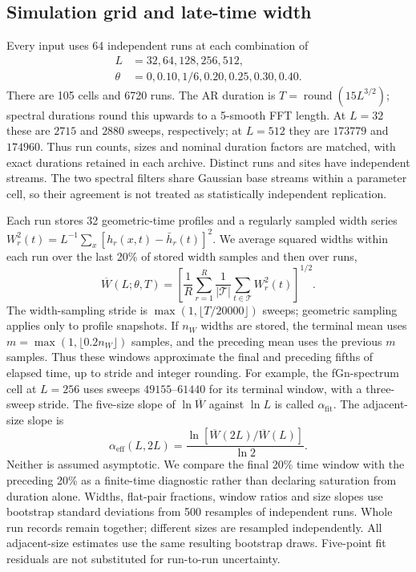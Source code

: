 \subsection{Simulation grid and late-time width}
Every input uses 64 independent runs at each combination of
\begin{align}
 L&=32,64,128,256,512,\\
 \theta&=0,0.10,1/6,0.20,0.25,0.30,0.40.
\end{align}
There are 105 cells and 6720 runs. The AR duration is
$T=\operatorname{round}(15L^{3/2})$; spectral durations round this upwards to a
5-smooth FFT length. At $L=32$ these are $2715$ and $2880$ sweeps, respectively;
at $L=512$ they are $173779$ and $174960$. Thus run counts, sizes and nominal
duration factors are matched, with exact durations retained in each archive.
Distinct runs and sites have independent streams. The two spectral filters
share Gaussian base streams within a parameter cell, so their agreement is
not treated as statistically independent replication.

Each run stores 32 geometric-time profiles and a regularly sampled width series
$W_r^2(t)=L^{-1}\sum_x[h_r(x,t)-\bar h_r(t)]^2$. We average squared widths
within each run over the last 20\% of stored width samples and then over runs,
\begin{equation}
 \overline W(L;\theta,T)=\left[\frac1R\sum_{r=1}^R
       \frac1{|\mathcal T|}\sum_{t\in\mathcal T}W_r^2(t)\right]^{1/2}.
 \label{eq:width}
\end{equation}
The width-sampling stride is $\max(1,\lfloor T/20000\rfloor)$ sweeps;
geometric sampling applies only to profile snapshots. If $n_W$ widths are
stored, the terminal mean uses $m=\max(1,\lfloor0.2n_W\rfloor)$ samples,
and the preceding mean uses the previous $m$ samples. Thus these windows
approximate the final and preceding fifths of elapsed time, up to stride and
integer rounding. For example, the fGn-spectrum cell at $L=256$ uses sweeps
$49155$--$61440$ for its terminal window, with a three-sweep stride.
The five-size slope of $\ln\overline W$ against $\ln L$ is called
$\alpha_{\mathrm{fit}}$. The adjacent-size slope is
\begin{equation}
 \alpha_{\mathrm{eff}}(L,2L)=
 \frac{\ln[\overline W(2L)/\overline W(L)]}{\ln2}.
 \label{eq:pair}
\end{equation}
Neither is assumed asymptotic. We compare the final 20\% time window with
the preceding 20\% as a finite-time diagnostic rather than declaring saturation
from duration alone. Widths, flat-pair fractions, window ratios and size slopes
use bootstrap standard deviations from 500 resamples of independent runs.
Whole run records remain together; different sizes are resampled independently.
All adjacent-size estimates use the same resulting bootstrap draws. Five-point
fit residuals are not substituted for run-to-run uncertainty.

